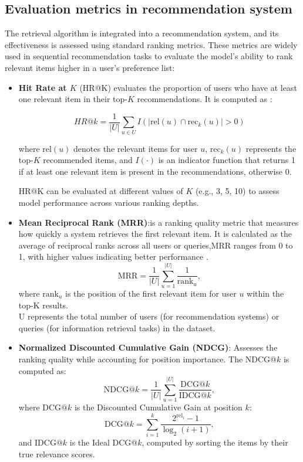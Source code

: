 \documentclass[review]{jair}
\begin{document}
\subsection{Evaluation metrics in recommendation system}

The retrieval algorithm is integrated into a recommendation system, and its effectiveness is assessed using standard ranking metrics. These metrics are widely used in sequential recommendation tasks to evaluate the model's ability to rank relevant items higher in a user's preference list:

\begin{itemize}
	\item \textbf {Hit Rate at \( K \)} (HR@K) evaluates the proportion of users who have at least one relevant item in their top-\( K \) recommendations. It is computed as \cite{eviden2025mrr}:
	
	\begin{equation}
	HR@k = \frac{1}{|U|} \sum_{u \in U} I(|\text{rel}(u) \cap \text{rec}_k(u)| > 0)
	\end{equation}
	
	where \( \text{rel}(u) \) denotes the relevant items for user \( u \), \( \text{rec}_k(u) \) represents the top-\( K \) recommended items, and \( I(\cdot) \) is an indicator function that returns 1 if at least one relevant item is present in the recommendations, otherwise 0.  
	
	HR@K can be evaluated at different values of \( K \) (e.g., 3, 5, 10) to assess model performance across various ranking depths.
	
	\item \textbf{Mean Reciprocal Rank (MRR)}:is a ranking quality metric that measures how quickly a system retrieves the first relevant item. It is calculated as the average of reciprocal ranks across all users or queries,MRR ranges from 0 to 1, with higher values indicating better performance \cite{eviden2025mrr}.
	\begin{equation}
	\text{MRR} = \frac{1}{|U|} \sum_{u=1}^{|U|} \frac{1}{\text{rank}_u},
	\end{equation}
	where \( \text{rank}_u \) is the position of the first relevant item for user \( u \) within the top-K results. \\ 
	U represents the total number of users (for recommendation systems) or queries (for information retrieval tasks) in the dataset.
	
	\item \textbf{Normalized Discounted Cumulative Gain (NDCG)}: Assesses the ranking quality while accounting for position importance. The NDCG@\( k \) is computed as:\cite{eviden2025mrr}
	\begin{equation}
	\text{NDCG@}k = \frac{1}{|U|} \sum_{u=1}^{|U|} \frac{\text{DCG@}k}{\text{IDCG@}k},
	\end{equation}
	where \( \text{DCG@}k \) is the Discounted Cumulative Gain at position \( k \):
	\begin{equation}
	\text{DCG@}k = \sum_{i=1}^{k} \frac{2^{\text{rel}_i} - 1}{\log_2(i + 1)},
	\end{equation}
	and \( \text{IDCG@}k \) is the Ideal DCG@\( k \), computed by sorting the items by their true relevance scores.
\end{itemize}  
\end{document}
